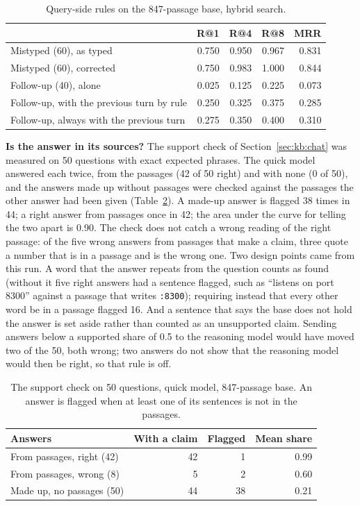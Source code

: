\begin{table}[t]
\centering\scriptsize
\caption{Query-side rules on the 847-passage base, hybrid search.}
\label{tab:p26}
\begin{tabular}{@{}p{4.3cm}rrrr@{}}
\toprule
 & R@1 & R@4 & R@8 & MRR \\
\midrule
Mistyped (60), as typed & 0.750 & 0.950 & 0.967 & 0.831 \\
Mistyped (60), corrected & 0.750 & 0.983 & 1.000 & 0.844 \\
\midrule
Follow-up (40), alone & 0.025 & 0.125 & 0.225 & 0.073 \\
Follow-up, with the previous turn by rule & 0.250 & 0.325 & 0.375 & 0.285 \\
Follow-up, always with the previous turn & 0.275 & 0.350 & 0.400 & 0.310 \\
\bottomrule
\end{tabular}
\end{table}

\textbf{Is the answer in its sources?} The support check of
Section~\ref{sec:kb:chat} was measured on 50 questions with exact expected
phrases. The quick model answered each twice, from the passages (42 of 50
right) and with none (0 of 50), and the answers made up without passages
were checked against the passages the other answer had been given
(Table~\ref{tab:support}). A made-up answer is flagged 38 times in 44; a
right answer from passages once in 42; the area under the curve for telling
the two apart is 0.90. The check does not catch a wrong reading of the right
passage: of the five wrong answers from passages that make a claim, three
quote a number that is in a passage and is the wrong one. Two design points
came from this run. A word that the answer repeats from the question counts
as found (without it five right answers had a sentence flagged, such as
``listens on port 8300'' against a passage that writes \texttt{:8300});
requiring instead that every other word be in a passage flagged 16. And a
sentence that says the base does not hold the answer is set aside rather
than counted as an unsupported claim. Sending answers below a supported
share of 0.5 to the reasoning model would have moved two of the 50, both
wrong; two answers do not show that the reasoning model would then be right,
so that rule is off.

\begin{table}[t]
\centering\scriptsize
\caption{The support check on 50 questions, quick model, 847-passage base. An answer is flagged when at least one of its sentences is not in the passages.}
\label{tab:support}
\begin{tabular}{@{}p{3.7cm}rrr@{}}
\toprule
Answers & With a claim & Flagged & Mean share \\
\midrule
From passages, right (42) & 42 & 1 & 0.99 \\
From passages, wrong (8) & 5 & 2 & 0.60 \\
Made up, no passages (50) & 44 & 38 & 0.21 \\
\bottomrule
\end{tabular}
\end{table}

